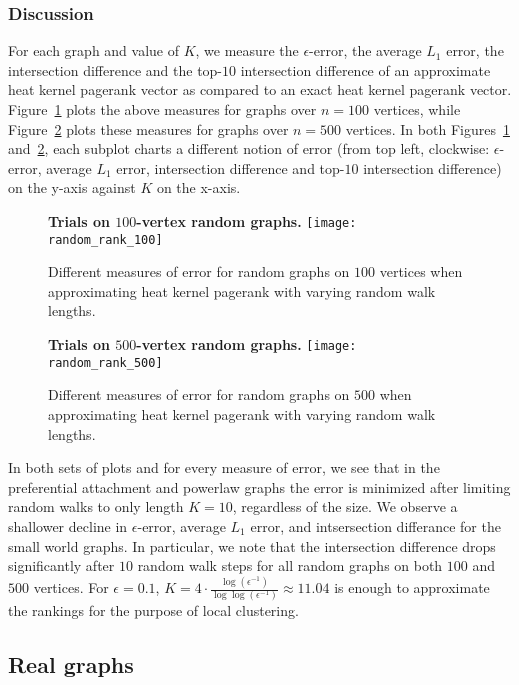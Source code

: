 \documentclass[runningheads,a4paper]{llncs}
\newcommand{\kparam}{\frac{\log(\epsilon^{-1})}{\log\log(\epsilon^{-1})}}
\begin{document}
\subsubsection{Discussion} For each graph and value of $K$, we measure the
$\epsilon$-error, the average $L_1$ error, the intersection difference and the
top-$10$ intersection difference of an approximate heat kernel pagerank vector
as compared to an exact heat kernel pagerank vector.
Figure~\ref{fig:random_rank_100} plots the above measures for graphs over
$n=100$ vertices, while Figure~\ref{fig:random_rank_500} plots these measures
for graphs over $n=500$ vertices.  In both Figures~\ref{fig:random_rank_100}
and~\ref{fig:random_rank_500}, each subplot charts a different notion of error
(from top left, clockwise: $\epsilon$-error, average $L_1$ error, intersection
difference and top-$10$ intersection difference) on the y-axis against $K$ on
the x-axis.  

\begin{figure}
\centering
\textbf{Trials on $100$-vertex random graphs.}
\texttt{[image: random\_rank\_100]}
\caption{Different measures of error for random graphs on $100$ vertices when approximating heat
kernel pagerank with varying random walk lengths.}
\label{fig:random_rank_100}
\end{figure}

\begin{figure}
\centering
\textbf{Trials on $500$-vertex random graphs.}
\texttt{[image: random\_rank\_500]}
\caption{Different measures of error for random graphs on $500$ when approximating heat
kernel pagerank with varying random walk lengths.}
\label{fig:random_rank_500}
\end{figure}

In both sets of plots and for every measure of error, we see that in the
preferential attachment and powerlaw graphs the error is minimized after
limiting random walks to only length $K=10$, regardless of the size.  We observe
a shallower decline in $\epsilon$-error, average $L_1$ error, and intsersection
differance for the small world graphs.  In particular, we note that the
intersection difference drops significantly after $10$ random walk steps for all
random graphs on both $100$ and $500$ vertices.  For $\epsilon = 0.1$, $K =
4\cdot \kparam \approx 11.04$ is enough to approximate the rankings for the
purpose of local clustering.


\subsection{Real graphs}
\label{sec:realranking}
\end{document}
